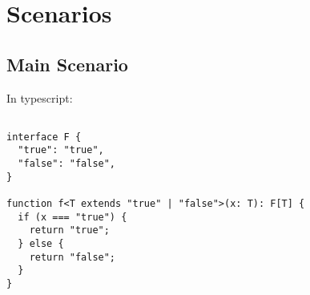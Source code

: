 \section{Scenarios}

\subsection{Main Scenario}

In typescript:

\begin{lstlisting}

interface F {
  "true": "true",
  "false": "false",
}

function f<T extends "true" | "false">(x: T): F[T] {
  if (x === "true") {
    return "true";
  } else {
    return "false";
  }
}
\end{lstlisting}


